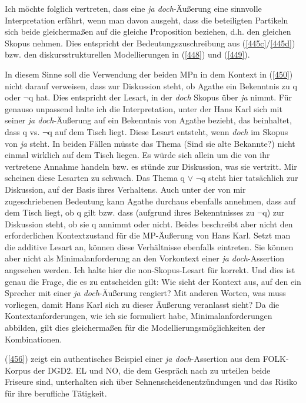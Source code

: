 Ich möchte folglich vertreten, dass eine \textit{ja doch}-Äußerung eine sinnvolle Interpretation erfährt, wenn man davon ausgeht, dass die beteiligten Partikeln sich beide gleichermaßen auf die gleiche Proposition beziehen, d.h. den gleichen Skopus nehmen. Dies entspricht der Bedeutungszuschreibung aus (\ref{445c}/\ref{445d}) bzw. den diskursstrukturellen Modellierungen in (\ref{448}) und (\ref{449}).

In diesem Sinne soll die Verwendung der beiden MPn in dem Kontext in (\ref{450}) nicht darauf verweisen, dass zur Diskussion steht, ob Agathe ein Bekenntnis zu q oder $\neg$q hat. Dies entspricht der Lesart, in der \textit{doch} Skopus über \textit{ja} nimmt. Für genauso unpassend halte ich die Interpretation, unter der Hans Karl sich mit seiner \textit{ja doch}-Äußerung auf ein Bekenntnis von Agathe bezieht, das beinhaltet, dass q vs. $\neg$q auf dem Tisch liegt. Diese Lesart entsteht, wenn \textit{doch} im Skopus von \textit{ja} steht. In beiden Fällen müsste das Thema (Sind sie alte Bekannte?) nicht einmal wirklich auf dem Tisch liegen. Es würde sich allein um die von ihr vertretene Annahme handeln bzw. es stünde zur Diskussion, was sie vertritt. Mir scheinen diese Lesarten zu schwach. Das Thema q $\vee$ $\neg$q steht hier tatsächlich zur Diskussion, auf der Basis ihres Verhaltens. Auch unter der von mir zugeschriebenen Bedeutung kann Agathe durchaus ebenfalls annehmen, dass auf dem Tisch liegt, ob q gilt bzw. dass (aufgrund ihres Bekenntnisses zu $\neg$q) zur Diskussion steht, ob sie q annimmt oder nicht. Beides beschreibt aber nicht den erforderlichen Kontextzustand für die MP-Äußerung von Hans Karl. Setzt man die additive Lesart an, können diese Verhältnisse ebenfalls eintreten. Sie können aber nicht als Minimalanforderung an den Vorkontext einer \textit{ja doch}-Assertion angesehen werden. Ich halte hier die non-Skopus-Lesart für korrekt. Und dies ist genau die Frage, die es zu entscheiden gilt: Wie sieht der Kontext aus, auf den ein Sprecher mit einer \textit{ja doch}-Äußerung reagiert? Mit anderen Worten, was muss vorliegen, damit Hans Karl sich zu dieser Äußerung veranlasst sieht? Da die Kontextanforderungen, wie ich sie formuliert habe, Minimalanforderungen abbilden, gilt dies gleichermaßen für die Modellierungsmöglichkeiten der Kombinationen.

(\ref{456}) zeigt ein authentisches Beispiel einer \textit{ja doch}-Assertion aus dem FOLK-Korpus der DGD2. EL und NO, die dem Gespräch nach zu urteilen beide Friseure sind, unterhalten sich über Sehnenscheidenentzündungen und das Risiko für ihre berufliche Tätigkeit.

